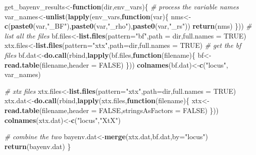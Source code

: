 \documentclass[]{article}
\newenvironment{Shaded}{\begin{snugshade}}{\end{snugshade}}
\newcommand{\KeywordTok}[1]{\textcolor[rgb]{0.13,0.29,0.53}{\textbf{#1}}}
\newcommand{\DataTypeTok}[1]{\textcolor[rgb]{0.13,0.29,0.53}{#1}}
\newcommand{\StringTok}[1]{\textcolor[rgb]{0.31,0.60,0.02}{#1}}
\newcommand{\CommentTok}[1]{\textcolor[rgb]{0.56,0.35,0.01}{\textit{#1}}}
\newcommand{\OtherTok}[1]{\textcolor[rgb]{0.56,0.35,0.01}{#1}}
\newcommand{\ControlFlowTok}[1]{\textcolor[rgb]{0.13,0.29,0.53}{\textbf{#1}}}
\newcommand{\NormalTok}[1]{#1}
\begin{document}
\begin{Shaded}
\begin{Highlighting}[]
\NormalTok{get_bayenv_results<-}\ControlFlowTok{function}\NormalTok{(dir,env_vars)\{}
  \CommentTok{# process the variable names}
\NormalTok{  var_names<-}\KeywordTok{unlist}\NormalTok{(}\KeywordTok{lapply}\NormalTok{(env_vars,}\ControlFlowTok{function}\NormalTok{(var)\{}
\NormalTok{    nms<-}\KeywordTok{c}\NormalTok{(}\KeywordTok{paste0}\NormalTok{(var,}\StringTok{"_BF"}\NormalTok{),}\KeywordTok{paste0}\NormalTok{(var,}\StringTok{"_rho"}\NormalTok{),}\KeywordTok{paste0}\NormalTok{(var,}\StringTok{"_rs"}\NormalTok{))}
    \KeywordTok{return}\NormalTok{(nms)}
\NormalTok{  \}))}
  \CommentTok{# list all the files}
\NormalTok{  bf.files<-}\KeywordTok{list.files}\NormalTok{(}\DataTypeTok{pattern=}\StringTok{"bf"}\NormalTok{,}\DataTypeTok{path =}\NormalTok{ dir,}\DataTypeTok{full.names =} \OtherTok{TRUE}\NormalTok{)}
\NormalTok{  xtx.files<-}\KeywordTok{list.files}\NormalTok{(}\DataTypeTok{pattern=}\StringTok{"xtx"}\NormalTok{,}\DataTypeTok{path=}\NormalTok{dir,}\DataTypeTok{full.names =} \OtherTok{TRUE}\NormalTok{)}
  \CommentTok{# get the bf files}
\NormalTok{  bf.dat<-}\KeywordTok{do.call}\NormalTok{(rbind,}\KeywordTok{lapply}\NormalTok{(bf.files,}\ControlFlowTok{function}\NormalTok{(filename)\{}
\NormalTok{    bf<-}\KeywordTok{read.table}\NormalTok{(filename,}\DataTypeTok{header =} \OtherTok{FALSE}\NormalTok{)}
\NormalTok{  \}))}
  \KeywordTok{colnames}\NormalTok{(bf.dat)<-}\KeywordTok{c}\NormalTok{(}\StringTok{"locus"}\NormalTok{, var_names)}
  
  \CommentTok{# xtx files}
\NormalTok{  xtx.files<-}\KeywordTok{list.files}\NormalTok{(}\DataTypeTok{pattern=}\StringTok{"xtx"}\NormalTok{,}\DataTypeTok{path=}\NormalTok{dir,}\DataTypeTok{full.names =} \OtherTok{TRUE}\NormalTok{)}
\NormalTok{  xtx.dat<-}\KeywordTok{do.call}\NormalTok{(rbind,}\KeywordTok{lapply}\NormalTok{(xtx.files,}\ControlFlowTok{function}\NormalTok{(filename)\{}
\NormalTok{    xtx<-}\KeywordTok{read.table}\NormalTok{(filename,}\DataTypeTok{header =} \OtherTok{FALSE}\NormalTok{,}\DataTypeTok{stringsAsFactors =} \OtherTok{FALSE}\NormalTok{)}
\NormalTok{  \}))}
  \KeywordTok{colnames}\NormalTok{(xtx.dat)<-}\KeywordTok{c}\NormalTok{(}\StringTok{"locus"}\NormalTok{,}\StringTok{"XtX"}\NormalTok{)}
  
  \CommentTok{# combine the two}
\NormalTok{  bayenv.dat<-}\KeywordTok{merge}\NormalTok{(xtx.dat,bf.dat,}\DataTypeTok{by=}\StringTok{"locus"}\NormalTok{)}
  \KeywordTok{return}\NormalTok{(bayenv.dat)}
\NormalTok{\}}
\end{Highlighting}
\end{Shaded}
\end{document}
